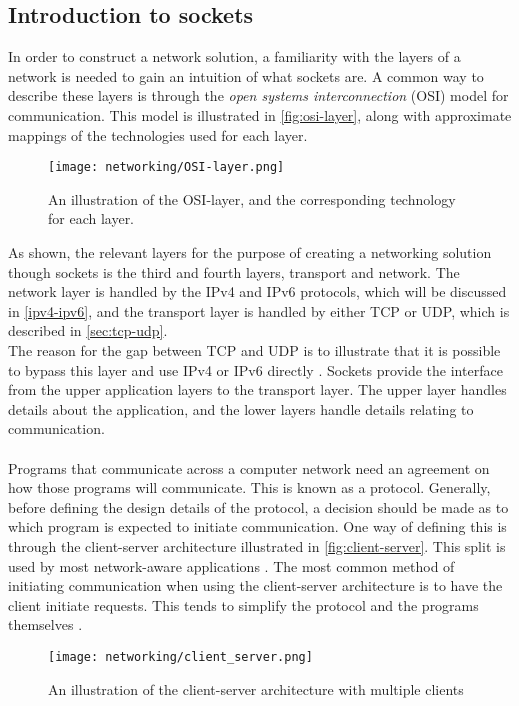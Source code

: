 \subsection{Introduction to sockets}
In order to construct a network solution, a familiarity with the layers of a network is needed to gain an intuition of what sockets are.
A common way to describe these layers is through the \textit{open systems interconnection} (OSI) model for communication.
This model is illustrated in \autoref{fig:osi-layer}, along with approximate mappings of the technologies used for each layer.
\begin{figure}[H]
    \centering
    \texttt{[image: networking/OSI-layer.png]}
    \caption{An illustration of the OSI-layer, and the corresponding technology for each layer.}
    \label{fig:osi-layer}
\end{figure}
\noindent
As shown, the relevant layers for the purpose of creating a networking solution though sockets is the third and fourth layers, transport and network.
The network layer is handled by the IPv4 and IPv6 protocols, which will be discussed in \autoref{ipv4-ipv6}, and the transport layer is handled by either TCP or UDP, which is described in \autoref{sec:tcp-udp}.\\
The reason for the gap between TCP and UDP is to illustrate that it is possible to bypass this layer and use IPv4 or IPv6 directly \cite{socketnetworking}.
Sockets provide the interface from the upper application layers to the transport layer.
The upper layer handles details about the application, and the lower layers handle details relating to communication.
\\\\
Programs that communicate across a computer network need an agreement on how those programs will communicate.
This is known as a protocol.
Generally, before defining the design details of the protocol, a decision should be made as to which program is expected to initiate communication.
One way of defining this is through the client-server architecture illustrated in \autoref{fig:client-server}.
This split is used by most network-aware applications \cite{socketnetworking}.
The most common method of initiating communication when using the client-server architecture is to have the client initiate requests.
This tends to simplify the protocol and the programs themselves \cite{socketnetworking}.

\begin{figure}[H]
    \centering
    \texttt{[image: networking/client\_server.png]}
    \caption{An illustration of the client-server architecture with multiple clients}
    \label{fig:client-server}
\end{figure}


